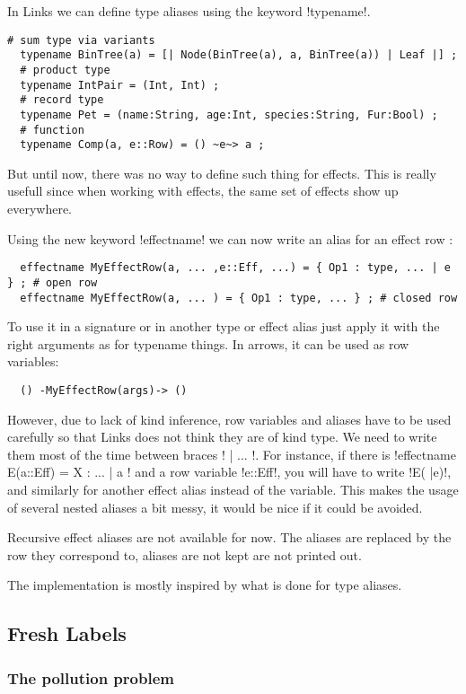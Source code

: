 \documentclass[11pt, nonacm=true, language=french, language=english]{acmart}
\begin{document}
In Links we can define type aliases using the keyword !typename!.
\begin{lstlisting}[caption=Type alias examples]
  # sum type via variants
  typename BinTree(a) = [| Node(BinTree(a), a, BinTree(a)) | Leaf |] ;
  # product type
  typename IntPair = (Int, Int) ;
  # record type
  typename Pet = (name:String, age:Int, species:String, Fur:Bool) ;
  # function
  typename Comp(a, e::Row) = () ~e~> a ;
\end{lstlisting}

But until now, there was no way to define such thing for effects. This is really usefull since when working with effects, the same set of effects show up everywhere.

Using the new keyword !effectname! we can now write an alias for an effect row :
\begin{lstlisting}
  effectname MyEffectRow(a, ... ,e::Eff, ...) = { Op1 : type, ... | e } ; # open row
  effectname MyEffectRow(a, ... ) = { Op1 : type, ... } ; # closed row
\end{lstlisting}

To use it in a signature or in another type or effect alias just apply it with the right arguments as for typename things. In arrows, it can be used as row variables:
\begin{lstlisting}
  () -MyEffectRow(args)-> ()
\end{lstlisting}

However, due to lack of kind inference, row variables and aliases have to be used carefully so that Links does not think they are of kind type. We need to write them most of the time between braces !{ | ... }!. For instance, if there is !effectname E(a::Eff) = {X : ... | a }! and a row variable !e::Eff!, you will have to write !E({ |e})!, and similarly for another effect alias instead of the variable. This makes the usage of several nested aliases a bit messy, it would be nice if it could be avoided.

Recursive effect aliases are not available for now. The aliases are replaced by the row they correspond to, aliases are not kept are not printed out.

The implementation is mostly inspired by what is done for type aliases.

\subsection{Fresh Labels}
\label{sec:fresh-labels}

\subsubsection{The pollution problem}
\label{sec:pollution-problem}
\end{document}
